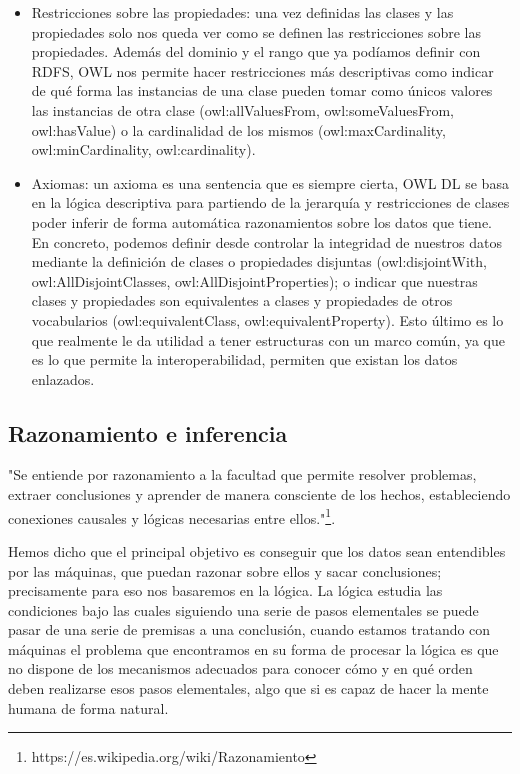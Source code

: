 \begin{itemize}
\begin{itemize}
	\end{itemize}
	\item Restricciones sobre las propiedades: una vez definidas las clases y las propiedades solo nos queda ver como se definen las restricciones sobre las propiedades. Además del dominio y el rango que ya podíamos definir con RDFS, OWL nos permite hacer restricciones más descriptivas como indicar de qué forma las instancias de una clase pueden tomar como únicos valores las instancias de otra clase (owl:allValuesFrom, owl:someValuesFrom, owl:hasValue) o la cardinalidad de los mismos (owl:maxCardinality, owl:minCardinality, owl:cardinality).
	\item Axiomas: un axioma es una sentencia que es siempre cierta, OWL DL se basa en la lógica descriptiva para partiendo de la jerarquía y restricciones de clases poder inferir de forma automática razonamientos sobre los datos que tiene. En concreto, podemos definir desde controlar la integridad de nuestros datos mediante la definición de clases o propiedades disjuntas (owl:disjointWith, owl:AllDisjointClasses, owl:AllDisjointProperties); o indicar que nuestras clases y propiedades son equivalentes a clases y propiedades de otros vocabularios (owl:equivalentClass, owl:equivalentProperty). Esto último es lo que realmente le da utilidad a tener estructuras con un marco común, ya que es lo que permite la interoperabilidad, permiten que existan los datos enlazados.
\end{itemize}

\subsection{Razonamiento e inferencia}

"Se entiende por razonamiento a la facultad que permite resolver problemas, extraer conclusiones y aprender de manera consciente de los hechos, estableciendo conexiones causales y lógicas necesarias entre ellos."\footnote{https://es.wikipedia.org/wiki/Razonamiento}.

\bigskip
Hemos dicho que el principal objetivo es conseguir que los datos sean entendibles por las máquinas, que puedan razonar sobre ellos y sacar conclusiones; precisamente para eso nos basaremos en la lógica. La lógica estudia las condiciones bajo las cuales siguiendo una serie de pasos elementales se puede pasar de una serie de premisas a una conclusión, cuando estamos tratando con máquinas el problema que encontramos en su forma de procesar la lógica es que no dispone de los mecanismos adecuados para conocer cómo y en qué orden deben realizarse esos pasos elementales, algo que si es capaz de hacer la mente humana de forma natural. 

